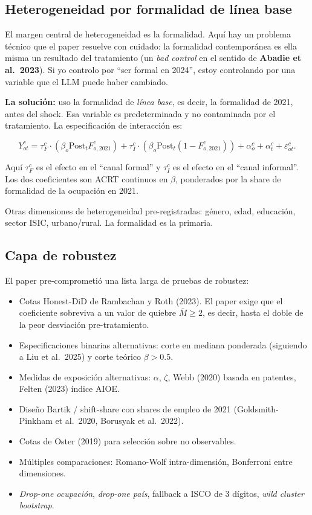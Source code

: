 \documentclass[12pt]{article}
\begin{document}
\subsection{Heterogeneidad por formalidad de línea base}

El margen central de heterogeneidad es la formalidad. Aquí hay un problema técnico que el paper resuelve con cuidado: la formalidad contemporánea es ella misma un resultado del tratamiento (un \emph{bad control} en el sentido de \textbf{Abadie et al.\ 2023}). Si yo controlo por ``ser formal en 2024'', estoy controlando por una variable que el LLM puede haber cambiado.

\textbf{La solución:} uso la formalidad de \emph{línea base}, es decir, la formalidad de 2021, antes del shock. Esa variable es predeterminada y no contaminada por el tratamiento. La especificación de interacción es:

\[
Y_{ot}^c = \tau_F^c \cdot (\beta_o \text{Post}_t F_{o,2021}^c) + \tau_I^c \cdot (\beta_o \text{Post}_t (1 - F_{o,2021}^c)) + \alpha_o^c + \alpha_t^c + \varepsilon_{ot}^c.
\]

Aquí $\tau_F^c$ es el efecto en el ``canal formal'' y $\tau_I^c$ es el efecto en el ``canal informal''. Los dos coeficientes son ACRT continuos en $\beta$, ponderados por la share de formalidad de la ocupación en 2021.

Otras dimensiones de heterogeneidad pre-registradas: género, edad, educación, sector ISIC, urbano/rural. La formalidad es la primaria.

\subsection{Capa de robustez}

El paper pre-comprometió una lista larga de pruebas de robustez:

\begin{itemize}
  \item Cotas Honest-DiD de Rambachan y Roth (2023). El paper exige que el coeficiente sobreviva a un valor de quiebre $\bar M \geq 2$, es decir, hasta el doble de la peor desviación pre-tratamiento.
  \item Especificaciones binarias alternativas: corte en mediana ponderada (siguiendo a Liu et al.\ 2025) y corte teórico $\beta > 0.5$.
  \item Medidas de exposición alternativas: $\alpha$, $\zeta$, Webb (2020) basada en patentes, Felten (2023) índice AIOE.
  \item Diseño Bartik / shift-share con shares de empleo de 2021 (Goldsmith-Pinkham et al.\ 2020, Borusyak et al.\ 2022).
  \item Cotas de Oster (2019) para selección sobre no observables.
  \item Múltiples comparaciones: Romano-Wolf intra-dimensión, Bonferroni entre dimensiones.
  \item \emph{Drop-one ocupación}, \emph{drop-one país}, fallback a ISCO de 3 dígitos, \emph{wild cluster bootstrap}.
\end{itemize}
\end{document}
